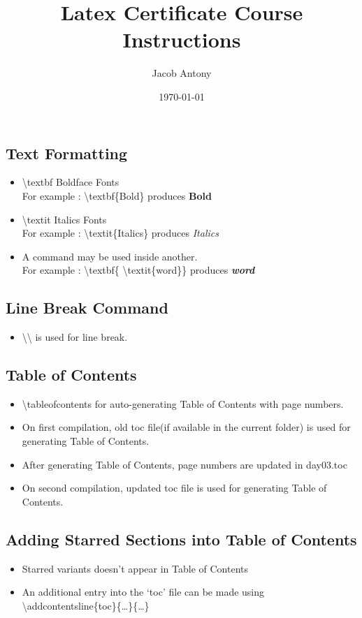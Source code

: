 \documentclass{article}
\title{Latex Certificate Course Instructions}
\author{Jacob Antony}
\date{\today}
\begin{document}
\maketitle

\subsection{Text Formatting}
\begin{itemize}
	\item \textbackslash{}textbf Boldface Fonts\\ For example : \textbackslash{}textbf\{Bold\} produces \textbf{Bold}
	\item \textbackslash{}textit Italics Fonts\\ For example : \textbackslash{}textit\{Italics\} produces \textit{Italics}
	\item A command may be used inside another. \\  For example : \textbackslash{}textbf\{ \textbackslash{}textit\{word\}\} produces \textbf{\textit{word}}
\end{itemize}

\subsection{Line Break Command}
\begin{itemize}
	\item \textbackslash{}\textbackslash{} is used for line break.
\end{itemize}

\subsection{Table of Contents}
\begin{itemize}
	\item \textbackslash{}tableofcontents for auto-generating Table of Contents with page numbers.
	\item On first compilation, old toc file(if available in the current folder) is used for generating Table of Contents.
	\item After generating Table of Contents, page numbers are updated in day03.toc
	\item On second compilation, updated toc file is used for generating Table of Contents.
\end{itemize}

\subsection{Adding Starred Sections into Table of Contents}
\begin{itemize}
	\item Starred variants doesn't appear in Table of Contents
	\item An additional entry into the `toc' file can be made using \textbackslash{}addcontentsline\{toc\}\{\dots\}\{\dots\}
\end{itemize}
\end{document}
